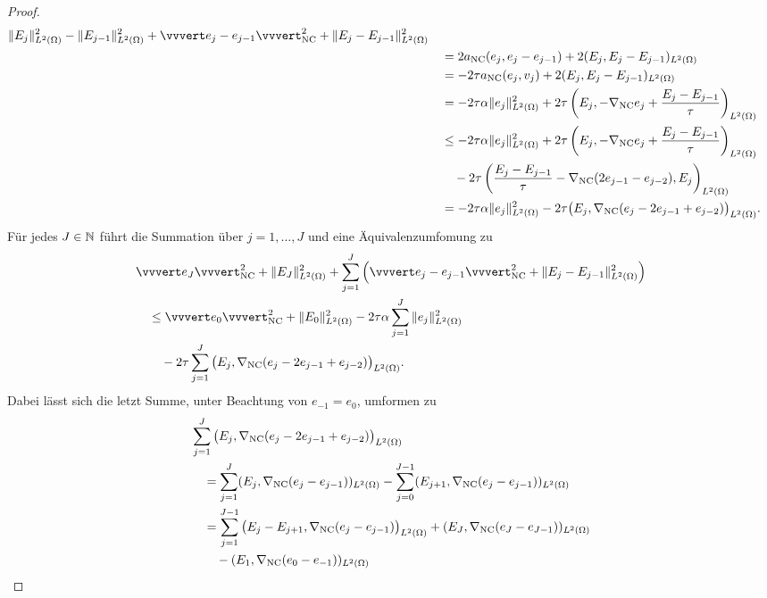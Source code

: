 \begin{proof}
\begin{align*}
    \Vert E_j \Vert_{L^2(\Omega)}^2 - \Vert E_{j-1}\Vert_{L^2(\Omega)}^2 +
    \vvvert e_j-e_{j-1}\vvvert_\nc^2 +
    \Vert E_j - E_{j-1} \Vert_{L^2(\Omega)}^2\\
    &\quad =
    2a_\nc(e_j,e_j-e_{j-1}) + 2(E_j,E_j-E_{j-1})_{L^2(\Omega)}\\
    &\quad =
    -2\tau a_\nc(e_j,v_j) + 2(E_j,E_j-E_{j-1})_{L^2(\Omega)}\\
    &\quad =
    -2\tau\alpha\Vert e_j\Vert_{L^2(\Omega)}^2 + 2\tau\left(E_j,
    -\nabla_\nc e_j+\frac{E_j-E_{j-1}}{\tau}\right)_{L^2(\Omega)} \\
    &\quad \leq
    -2\tau\alpha\Vert e_j\Vert_{L^2(\Omega)}^2 + 2\tau\left(E_j,
    -\nabla_\nc e_j+\frac{E_j-E_{j-1}}{\tau}\right)_{L^2(\Omega)}\\ 
    &\quad\quad -2\tau\left( \frac{E_j-E_{j-1}}{\tau}
    -\gradnc(2e_{j-1}-e_{j-2}),E_j\right)_{L^2(\Omega)}\\
    &\quad =
    -2\tau\alpha\Vert e_j\Vert_{L^2(\Omega)}^2 - 
    2\tau\big(E_j,\gradnc(e_j-2e_{j-1}+e_{j-2})\big)_{L^2(\Omega)}.
  \end{align*}
  Für jedes $J\in\mathbb{N}$ führt die Summation über $j=1,\ldots,J$ und eine
  Äquivalenz\-umfomung zu
  \begin{align}
    \label{eq:convProofF}
    &\vvvert e_J \vvvert^2_\nc +\Vert E_J \Vert_{L^2(\Omega)}^2 
    +\sum_{j=1}^J\left(\vvvert e_j-e_{j-1} \vvvert_\nc^2 + 
    \Vert E_j-E_{j-1}\Vert_{L^2(\Omega)}^2\right)\notag \\
    &\quad \leq 
    \vvvert e_0 \vvvert_\nc^2 + \Vert E_0 \Vert_{L^2(\Omega)}^2 
    -2\tau\alpha\sum_{j=1}^J \Vert e_j\Vert^2_{L^2(\Omega)} \\
    &\quad\quad
    -2\tau \sum_{j=1}^J\big(E_j,\gradnc
    (e_j-2e_{j-1}+e_{j-2})\big)_{L^2(\Omega)}.\notag
  \end{align}
  Dabei lässt sich die letzt Summe, unter Beachtung von $e_{-1}=e_0$, umformen
  zu
  \begin{align*}
    &\sum_{j=1}^J\big(E_j,\gradnc
    (e_j-2e_{j-1}+e_{j-2})\big)_{L^2(\Omega)}\\
    &\quad=\sum_{j=1}^J(E_j,\gradnc(e_j-e_{j-1}))_{L^2(\Omega)}
    -
    \sum_{j=0}^{J-1}(E_{j+1},\gradnc(e_j-e_{j-1}))_{L^2(\Omega)} \\
    &\quad = 
    \sum_{j=1}^{J-1} 
    \big(E_j-E_{j+1},\gradnc(e_j-e_{j-1})\big)_{L^2(\Omega)}
    +(E_J,\gradnc(e_J-e_{J-1}))_{L^2(\Omega)}\\
    &\quad\quad 
    - (E_1, \gradnc(e_0-e_{-1}))_{L^2(\Omega)} \\

\end{align*}
\end{proof}
